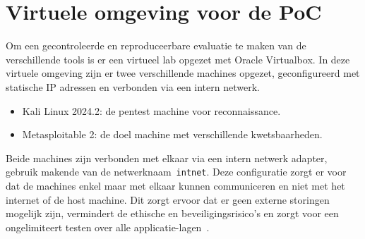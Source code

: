 \section{Virtuele omgeving voor de PoC}
Om een gecontroleerde en reproduceerbare evaluatie te maken van de verschillende tools is er een virtueel lab opgezet met Oracle Virtualbox.
In deze virtuele omgeving zijn er twee verschillende machines opgezet, geconfigureerd met statische IP adressen en verbonden via een intern netwerk.

\begin{itemize}
  \item Kali Linux 2024.2: de pentest machine voor reconnaissance.
  \item Metasploitable 2: de doel machine met verschillende kwetsbaarheden.
\end{itemize}

Beide machines zijn verbonden met elkaar via een intern netwerk adapter, gebruik makende van de netwerknaam~\texttt{intnet}.
Deze configuratie zorgt er voor dat de machines enkel maar met elkaar kunnen communiceren en niet met het internet of de host machine.
Dit zorgt ervoor dat er geen externe storingen mogelijk zijn, vermindert de ethische en beveiligingsrisico's en zorgt voor een ongelimiteert testen over alle applicatie-lagen~\autocite{Georgia2014}.
